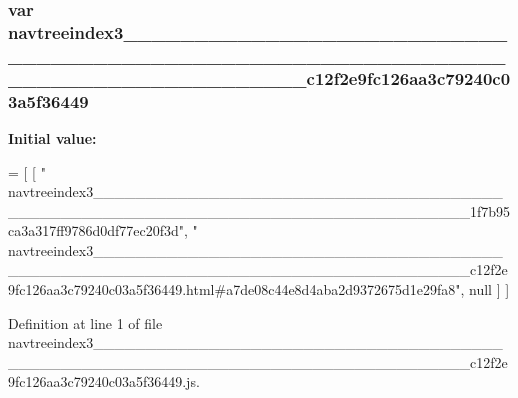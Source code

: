 \subsubsection[{navtreeindex3\+\_\+\+\_\+\+\_\+\+\_\+\+\_\+\+\_\+\+\_\+\+\_\+\+\_\+\+\_\+\+\_\+\+\_\+\+\_\+\+\_\+\+\_\+\+\_\+\+\_\+\+\_\+\+\_\+\+\_\+\+\_\+\+\_\+\+\_\+\+\_\+\+\_\+\+\_\+\+\_\+\+\_\+\+\_\+\+\_\+\+\_\+\+\_\+\+\_\+\+\_\+\+\_\+\+\_\+\+\_\+\+\_\+\+\_\+\+\_\+\+\_\+\+\_\+\+\_\+\+\_\+\+\_\+\+\_\+\+\_\+\+\_\+\+\_\+\+\_\+\+\_\+\+\_\+\+\_\+\+\_\+\+\_\+\+\_\+\+\_\+\+\_\+\+\_\+\+\_\+\+\_\+\+\_\+\+\_\+\+\_\+\+\_\+\+\_\+\+\_\+\+\_\+\+\_\+\+\_\+\+\_\+\+\_\+\+\_\+\+\_\+\+\_\+\+\_\+\+\_\+\+\_\+\+\_\+\+\_\+\+\_\+\+\_\+\+\_\+c12f2e9fc126aa3c79240c03a5f36449}]{\setlength{\rightskip}{0pt plus 5cm}var navtreeindex3\+\_\+\+\_\+\+\_\+\+\_\+\+\_\+\+\_\+\+\_\+\+\_\+\+\_\+\+\_\+\+\_\+\+\_\+\+\_\+\+\_\+\+\_\+\+\_\+\+\_\+\+\_\+\+\_\+\+\_\+\+\_\+\+\_\+\+\_\+\+\_\+\+\_\+\+\_\+\+\_\+\+\_\+\+\_\+\+\_\+\+\_\+\+\_\+\+\_\+\+\_\+\+\_\+\+\_\+\+\_\+\+\_\+\+\_\+\+\_\+\+\_\+\+\_\+\+\_\+\+\_\+\+\_\+\+\_\+\+\_\+\+\_\+\+\_\+\+\_\+\+\_\+\+\_\+\+\_\+\+\_\+\+\_\+\+\_\+\+\_\+\+\_\+\+\_\+\+\_\+\+\_\+\+\_\+\+\_\+\+\_\+\+\_\+\+\_\+\+\_\+\+\_\+\+\_\+\+\_\+\+\_\+\+\_\+\+\_\+\+\_\+\+\_\+\+\_\+\+\_\+\+\_\+\+\_\+\+\_\+\+\_\+\+\_\+\+\_\+c12f2e9fc126aa3c79240c03a5f36449}\label{navtreeindex3___________________________________________________________________________________f53d967c9be7da311cf59350894434ba_a98c7872f06c22036dd8cce474abaa6a6}
{\bfseries Initial value\+:}
\begin{DoxyCode}
=
[
    [ \textcolor{stringliteral}{"
      navtreeindex3\_\_\_\_\_\_\_\_\_\_\_\_\_\_\_\_\_\_\_\_\_\_\_\_\_\_\_\_\_\_\_\_\_\_\_\_\_\_\_\_\_\_\_\_\_\_\_\_\_\_\_\_\_\_\_\_\_\_\_\_\_\_\_\_\_\_\_\_\_\_\_\_\_\_\_\_\_\_\_\_\_\_\_1f7b95ca3a317ff9786d0df77ec20f3d"}, \textcolor{stringliteral}{"
      navtreeindex3\_\_\_\_\_\_\_\_\_\_\_\_\_\_\_\_\_\_\_\_\_\_\_\_\_\_\_\_\_\_\_\_\_\_\_\_\_\_\_\_\_\_\_\_\_\_\_\_\_\_\_\_\_\_\_\_\_\_\_\_\_\_\_\_\_\_\_\_\_\_\_\_\_\_\_\_\_\_\_\_\_\_\_c12f2e9fc126aa3c79240c03a5f36449.html#a7de08c44e8d4aba2d9372675d1e29fa8"}, null ]
]
\end{DoxyCode}


Definition at line 1 of file navtreeindex3\+\_\+\+\_\+\+\_\+\+\_\+\+\_\+\+\_\+\+\_\+\+\_\+\+\_\+\+\_\+\+\_\+\+\_\+\+\_\+\+\_\+\+\_\+\+\_\+\+\_\+\+\_\+\+\_\+\+\_\+\+\_\+\+\_\+\+\_\+\+\_\+\+\_\+\+\_\+\+\_\+\+\_\+\+\_\+\+\_\+\+\_\+\+\_\+\+\_\+\+\_\+\+\_\+\+\_\+\+\_\+\+\_\+\+\_\+\+\_\+\+\_\+\+\_\+\+\_\+\+\_\+\+\_\+\+\_\+\+\_\+\+\_\+\+\_\+\+\_\+\+\_\+\+\_\+\+\_\+\+\_\+\+\_\+\+\_\+\+\_\+\+\_\+\+\_\+\+\_\+\+\_\+\+\_\+\+\_\+\+\_\+\+\_\+\+\_\+\+\_\+\+\_\+\+\_\+\+\_\+\+\_\+\+\_\+\+\_\+\+\_\+\+\_\+\+\_\+\+\_\+\+\_\+\+\_\+\+\_\+\+\_\+\+\_\+\+\_\+c12f2e9fc126aa3c79240c03a5f36449.\+js.


